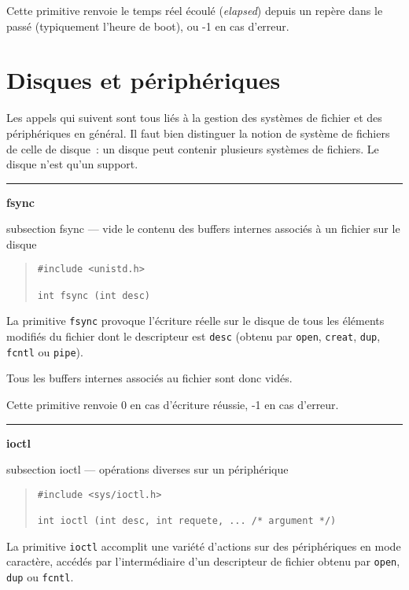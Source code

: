 \documentclass [twoside] {report}
\newcommand {\primitive} [1]
    {
	{\large \bf #1}
	\addcontentsline {toc} {subsection} {#1}
    }
\newcommand {\separation}
    {
	\vspace {7mm}
	\nopagebreak
	\hrule
    }
\begin{document}
Cette primitive renvoie le temps réel écoulé ({\it elapsed}) depuis un
repère dans le passé (typiquement l'heure de boot), ou -1 en cas
d'erreur.



\section {Disques et périphériques}


Les appels qui suivent sont tous liés à la
gestion des systèmes de fichier et des périphériques en
général. Il faut bien distinguer la notion de
système de fichiers de celle de disque~: un disque
peut contenir plusieurs systèmes de fichiers. Le
disque n'est qu'un support.




\separation
\primitive {fsync} --- vide le contenu des buffers internes associés à un fichier sur le disque

\begin {quote}
\begin {verbatim}
#include <unistd.h>

int fsync (int desc)
\end{verbatim}
\end {quote}

La primitive {\tt fsync} provoque l'écriture réelle
sur le disque de tous les éléments modifiés du fichier dont le
descripteur est {\tt desc} (obtenu par {\tt open},
{\tt creat}, {\tt dup}, {\tt fcntl} ou {\tt pipe}).

Tous les buffers internes associés au fichier
sont donc vidés.

Cette primitive renvoie 0 en cas d'écriture
réussie, -1 en cas d'erreur.




\separation
\primitive {ioctl} --- opérations diverses sur un périphérique

\begin {quote}
\begin {verbatim}
#include <sys/ioctl.h>

int ioctl (int desc, int requete, ... /* argument */)
\end{verbatim}
\end {quote}

La primitive {\tt ioctl} accomplit une variété
d'actions sur des périphériques en mode caractère,
accédés par l'intermédiaire d'un descripteur de
fichier obtenu par {\tt open}, {\tt dup} ou {\tt fcntl}.
\end{document}
